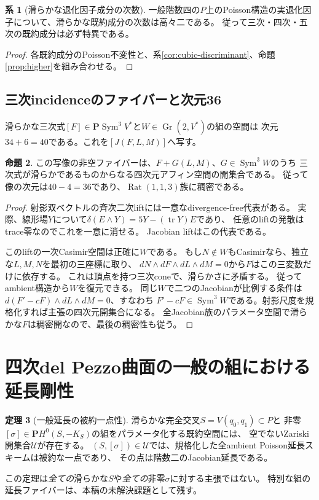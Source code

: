 \documentclass[a4paper,11pt]{ltjsarticle}
\theoremstyle{definition}
\newtheorem{theorem}{定理}[section]
\newtheorem{proposition}[theorem]{命題}
\newtheorem{corollary}[theorem]{系}
\theoremstyle{definition}\newtheorem{definition}[theorem]{定義}
\theoremstyle{remark}\newtheorem{remark}[theorem]{注意}
\newcommand{\PP}{\mathbf P}\renewcommand{\AA}{\mathbf A}\newcommand{\CC}{\mathbf C}
\newcommand{\Rat}{\operatorname{Rat}}\newcommand{\Gr}{\operatorname{Gr}}
\begin{document}
\begin{corollary}[滑らかな退化因子成分の次数]\label{cor:smooth-factor}
一般階数四の$P$上のPoisson構造の実退化因子について、滑らかな既約成分の次数は高々二である。
従って三次・四次・五次の既約成分は必ず特異である。
\end{corollary}
\begin{proof}
各既約成分のPoisson不変性と、系\ref{cor:cubic-discriminant}、命題\ref{prop:higher}を組み合わせる。
\end{proof}

\subsection{三次incidenceのファイバーと次元36}
滑らかな三次式$[F]\in\PP\operatorname{Sym}^3V^*$と$W\in\Gr(2,V^*)$の組の空間は
次元$34+6=40$である。これを$[J(F,L,M)]$へ写す。

\begin{proposition}\label{prop:cubic-fibre}
この写像の非空ファイバーは、$F+G(L,M)$、$G\in\operatorname{Sym}^3W$のうち
三次式が滑らかであるものからなる四次元アフィン空間の開集合である。
従って像の次元は$40-4=36$であり、$\Rat(1,1,3)$族に稠密である。
\end{proposition}
\begin{proof}
射影双ベクトルの斉次二次liftには一意なdivergence-free代表がある。
実際、線形場$Y$について$\delta(E\wedge Y)=5Y-(\operatorname{tr}Y)E$であり、
任意のliftの発散はtrace零なのでこれを一意に消せる。
Jacobian liftはこの代表である。

このliftの一次Casimir空間は正確に$W$である。
もし$N\notin W$もCasimirなら、独立な$L,M,N$を最初の三座標に取り、
$dN\wedge dF\wedge dL\wedge dM=0$から$F$はこの三変数だけに依存する。
これは頂点を持つ三次coneで、滑らかさに矛盾する。
従ってambient構造から$W$を復元できる。
同じ$W$で二つのJacobianが比例する条件は
$d(F'-cF)\wedge dL\wedge dM=0$、すなわち
$F'-cF\in\operatorname{Sym}^3W$である。射影尺度を規格化すれば主張の四次元開集合になる。
全Jacobian族のパラメータ空間で滑らかな$F$は稠密開なので、最後の稠密性も従う。
\end{proof}

\section{四次del Pezzo曲面の一般の組における延長剛性}
\begin{theorem}[一般延長の被約一点性]\label{thm:dp-rigidity}
滑らかな完全交叉$S=V(q_0,q_1)\subset P$と
非零$[\sigma]\in\PP H^0(S,-K_S)$の組をパラメータ化する既約空間には、
空でないZariski開集合$\mathcal U$が存在する。
$(S,[\sigma])\in\mathcal U$では、規格化した全ambient Poisson延長スキームは被約な一点であり、
その点は階数二のJacobian延長である。
\end{theorem}
この定理は\emph{全ての}滑らかな$S$や\emph{全ての}非零$\sigma$に対する主張ではない。
特別な組の延長ファイバーは、本稿の未解決課題として残す。
\end{document}
